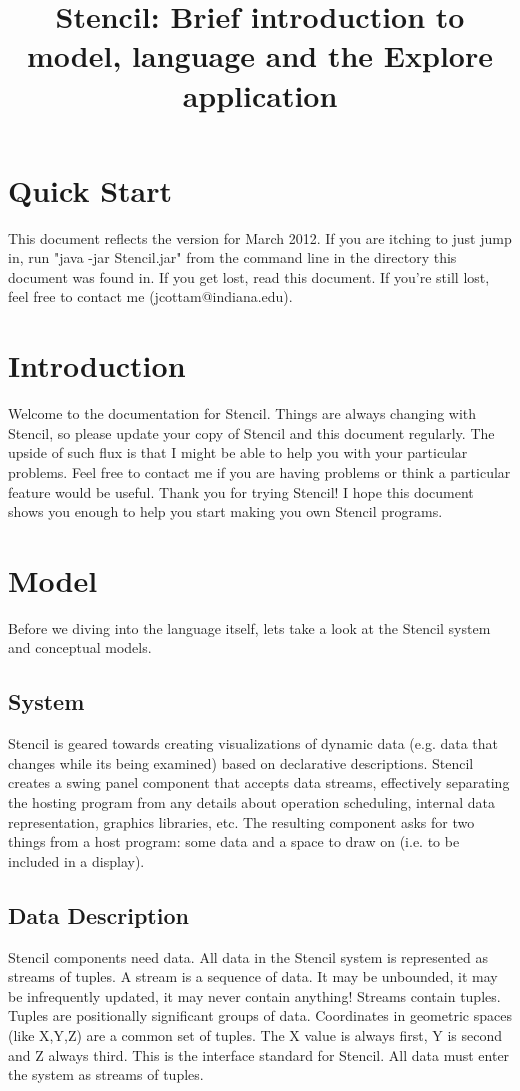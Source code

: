 \documentclass{article}
\title {Stencil: Brief introduction to model, language and the Explore application}
\begin{document}
\maketitle

\section {Quick Start}
This  document reflects the version for March 2012.
If you are itching to just jump in, run "java -jar Stencil.jar" from the command line in the directory this document was found in.  
If you get lost, read this document.  If you're still lost, feel free to contact me (jcottam@indiana.edu).


\section{Introduction}
Welcome to the documentation for Stencil.  
Things are always changing with Stencil, so please update your copy of Stencil and this document regularly.  
The upside of such flux is that I might be able to help you with your particular problems.  
Feel free to contact me if you are having problems or think a particular feature would be useful.  
Thank you for trying Stencil!  
I hope this document shows you enough to help you start making you own Stencil programs.

\section{Model}
Before we diving into the language itself, lets take a look at the Stencil system and conceptual models.


\subsection{System}
Stencil is geared towards creating visualizations of dynamic data (e.g. data that changes while its being examined) based on declarative descriptions.
Stencil creates a swing panel component that accepts data streams, 
effectively separating the hosting program from any details about operation scheduling, 
internal data representation, graphics libraries, etc.
%
The resulting component asks for two things from a host program: some data and a space to draw on (i.e. to be included in a display).  

\subsection{Data Description}
Stencil components need data.  
All data in the Stencil system is represented as streams of tuples.
A stream is a sequence of data.  
It may be unbounded, it may be infrequently updated, it may never contain anything!
Streams contain tuples.  
Tuples are positionally significant groups of data.  
Coordinates in geometric spaces (like X,Y,Z) are a common set of tuples.  
The X value is always first, Y is second and Z always third.  
This is the interface standard for Stencil.  
All data must enter the system as streams of tuples.
\end{document}
